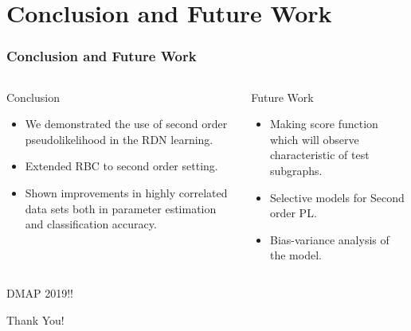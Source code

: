 \documentclass[10pt, blue,subsection=true, compress]{beamer}
\begin{document}
\section{Conclusion and Future Work}
\begin{frame}\frametitle{Conclusion and Future Work}
\begin{columns}[t]
\begin{flushleft}
\begin{block}{Conclusion}
\begin{itemize}
\item We demonstrated the use of second order pseudolikelihood in the RDN learning.
\item Extended RBC to second order setting.
\item Shown improvements in highly correlated data sets both in parameter estimation
and classification accuracy. 
\end{itemize}
\end{block}
\end{flushleft}
\begin{block}{Future Work}
\begin{itemize}
\item Making score function which will observe characteristic
of test subgraphs.
\item Selective models for Second order PL.
\item  Bias-variance analysis of the model.
\end{itemize}
\end{block}
\end{columns}
\begin{block}{}
\begin{center}
{\color{red}
DMAP 2019!!}
\end{center}
\end{block}
\end{frame}


\begin{frame}
 
\begin{center}

{\fontsize{40}{50}\selectfont Thank You!}


\end{center}
\end{frame} 


\end{document}
